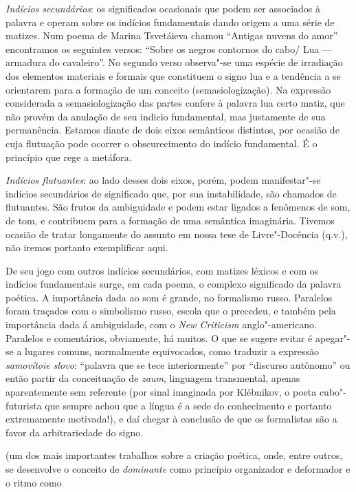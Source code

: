 {  \emph{Indícios secundários}: os significados ocasionais que podem ser
  associados à palavra e operam sobre os indícios fundamentais dando
  origem a uma série de matizes. Num poema de Marina Tsvetáieva chamou
  ``Antigas nuvens do amor'' encontramos os seguintes versos: ``Sobre os
  negros contornos do cabo/ Lua --- armadura do cavaleiro''. No segundo
  verso observa"-se uma espécie de irradiação dos elementos materiais e
  formais que constituem o signo lua e a tendência a se orientarem para
  a formação de um conceito (semasiologização). Na expressão considerada
  a semasiologização das partes confere à palavra lua certo matiz, que
  não provém da anulação de seu indicio fundamental, mas justamente de
  sua permanência. Estamos diante de dois eixos semânticos distintos,
  por ocasião de cuja flutuação pode ocorrer o obscurecimento do indício
  fundamental. É o princípio que rege a metáfora.

  \emph{Indícios flutuantes}: ao lado desses dois eixos, porém, podem
  manifestar"-se indícios secundários de significado que, por sua
  instabilidade, são chamados de flutuantes. São frutos da ambiguidade e
  podem estar ligados a fenômenos de som, de tom, e contribuem para a
  formação de uma semântica imaginária. Tivemos ocasião de tratar
  longamente do assunto em nossa tese de Livre"-Docência (q.v.), não
  iremos portanto exemplificar aqui.

  De seu jogo com outros indícios secundários, com matizes léxicos e com
  os indícios fundamentais surge, em cada poema, o complexo significado
  da palavra poética. A importância dada ao som é grande, no formalismo
  russo. Paralelos foram traçados com o simbolismo russo, escola que o
  precedeu, e também pela importância dada á ambiguidade, com o
  \emph{New Criticism} anglo"-americano. Paralelos e comentários,
  obviamente, há muitos. O que se sugere evitar é apegar"-se a lugares
  comuns, normalmente equivocados, como traduzir a expressão
  \emph{samovítoie slovo}: ``palavra que se tece interiormente'' por
  ``discurso autônomo'' ou então partir da conceituação de \emph{zaum},
  linguagem transmental, apenas aparentemente sem referente (por sinal
  imaginada por Klébnikov, o poeta cubo"-futurista que sempre achou que a
  língua é a sede do conhecimento e portanto extremamente motivada!), e
  daí chegar à conclusão de que os formalistas são a favor da
  arbitrariedade do signo.} (um dos mais importantes trabalhos sobre a
criação poética, onde, entre outros, se desenvolve o conceito de
\emph{dominante} como princípio organizador e deformador e o ritmo como
